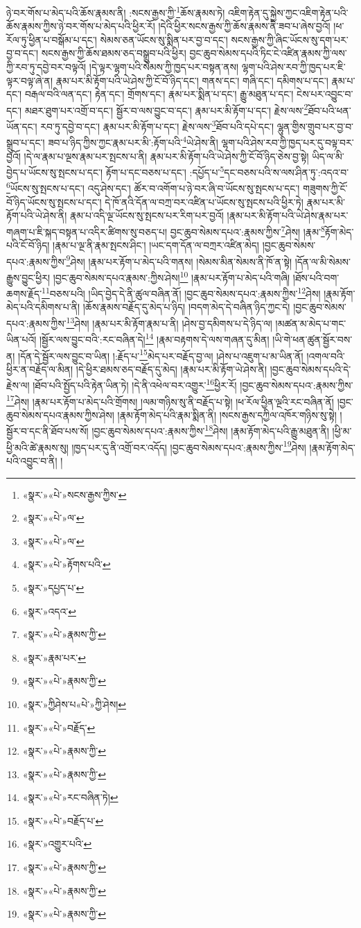 ཉེ་བར་གོས་པ་མེད་པའི་ཆོས་རྣམས་ནི། :སངས་རྒྱས་ཀྱི་\footnote{«སྣར་»«པེ་»སངས་རྒྱས་ཀྱིས་}ཆོས་རྣམས་ཏེ། འཇིག་རྟེན་དུ་སྐྱེས་ཀྱང་འཇིག་རྟེན་པའི་ཆོས་རྣམས་ཀྱིས་ཉེ་བར་གོས་པ་མེད་པའི་ཕྱིར་རོ། །དེའི་ཕྱིར་སངས་རྒྱས་ཀྱི་ཆོས་རྣམས་ནི་ཟབ་པ་ཞེས་བྱའོ། །ཕ་རོལ་ཏུ་ཕྱིན་པ་བསྒོམ་པ་དང་། སེམས་ཅན་ཡོངས་སུ་སྨིན་པར་བྱ་བ་དང་། སངས་རྒྱས་ཀྱི་ཞིང་ཡོངས་སུ་དག་པར་བྱ་བ་དང་། སངས་རྒྱས་ཀྱི་ཆོས་ཐམས་ཅད་བསྒྲུབ་པའི་ཕྱིར། བྱང་ཆུབ་སེམས་དཔའི་ཏིང་ངེ་འཛིན་རྣམས་ཀྱི་ལས་ཀྱི་རབ་ཏུ་དབྱེ་བར་བལྟའོ། །དེ་ལྟར་ལྷག་པའི་སེམས་ཀྱི་ཁྱད་པར་བསྟན་ནས། ལྷག་པའི་ཤེས་རབ་ཀྱི་ཁྱད་པར་ཇི་ལྟར་བལྟ་ཞེ་ན། རྣམ་པར་མི་རྟོག་པའི་ཡེ་ཤེས་ཀྱི་ངོ་བོ་ཉིད་དང་། གནས་དང་། གཞི་དང་། དམིགས་པ་དང་། རྣམ་པ་དང་། བརྒལ་བའི་ལན་དང་། རྟེན་དང་། གྲོགས་དང་། རྣམ་པར་སྨིན་པ་དང་། རྒྱུ་མཐུན་པ་དང་། ངེས་པར་འབྱུང་བ་དང་། མཐར་ཐུག་པར་འགྲོ་བ་དང་། སྦྱོར་བ་ལས་བྱུང་བ་དང་། རྣམ་པར་མི་རྟོག་པ་དང་། རྗེས་ལས་\footnote{«སྣར་»«པེ་»ལ་}ཐོབ་པའི་ཕན་ཡོན་དང་། རབ་ཏུ་དབྱེ་བ་དང་། རྣམ་པར་མི་རྟོག་པ་དང་། རྗེས་ལས་\footnote{«སྣར་»«པེ་»ལ་}ཐོབ་པའི་དཔེ་དང་། ལྷུན་གྱིས་གྲུབ་པར་བྱ་བ་སྒྲུབ་པ་དང་། ཟབ་པ་ཉིད་ཀྱིས་ཀྱང་རྣམ་པར་མི་:རྟོག་པའི་\footnote{«སྣར་»«པེ་»རྟོགས་པའི་}ཡེ་ཤེས་ནི། ལྷག་པའི་ཤེས་རབ་ཀྱི་ཁྱད་པར་དུ་བལྟ་བར་བྱའོ། །དེ་ལ་རྣམ་པ་ལྔས་རྣམ་པར་སྤངས་པ་ནི། རྣམ་པར་མི་རྟོག་པའི་ཡེ་ཤེས་ཀྱི་ངོ་བོ་ཉིད་ཅེས་བྱ་སྟེ། ཡིད་ལ་མི་བྱེད་པ་ཡོངས་སུ་སྤངས་པ་དང་། རྟོག་པ་དང་བཅས་པ་དང་། :དཔྱོད་པ་\footnote{«སྣར་»དཔྱད་པ་}དང་བཅས་པའི་ས་ལས་ཤིན་ཏུ་:འདའ་བ་\footnote{«སྣར་»འདའ་}ཡོངས་སུ་སྤངས་པ་དང་། འདུ་ཤེས་དང་། ཚོར་བ་འགོག་པ་ཉེ་བར་ཞི་བ་ཡོངས་སུ་སྤངས་པ་དང་། གཟུགས་ཀྱི་ངོ་བོ་ཉིད་ཡོངས་སུ་སྤངས་པ་དང་། དེ་ཁོ་ནའི་དོན་ལ་བཀྲ་བར་འཛིན་པ་ཡོངས་སུ་སྤངས་པའི་ཕྱིར་ཏེ། རྣམ་པར་མི་རྟོག་པའི་ཡེ་ཤེས་ནི། རྣམ་པ་འདི་ལྔ་ཡོངས་སུ་སྤངས་པར་རིག་པར་བྱའོ། །རྣམ་པར་མི་རྟོག་པའི་ཡེ་ཤེས་རྣམ་པར་གཞག་པ་ཇི་སྐད་བསྟན་པ་འདིར་ཚིགས་སུ་བཅད་པ། བྱང་ཆུབ་སེམས་དཔའ་:རྣམས་ཀྱིས་\footnote{«སྣར་»«པེ་»རྣམས་ཀྱི་}ཤེས། །རྣམ་\footnote{«སྣར་»རྣམ་པར་}རྟོག་མེད་པའི་ངོ་བོ་ཉིད། །རྣམ་པ་ལྔ་ནི་རྣམ་སྤངས་ཤིང་། །ཡང་དག་དོན་ལ་བཀྲར་འཛིན་མེད། །བྱང་ཆུབ་སེམས་དཔའ་:རྣམས་ཀྱིས་\footnote{«སྣར་»«པེ་»རྣམས་ཀྱི་}ཤེས། །རྣམ་པར་རྟོག་པ་མེད་པའི་གནས། །སེམས་མིན་སེམས་ནི་ཁོ་ན་སྟེ། །དོན་ལ་མི་སེམས་རྒྱུས་བྱུང་ཕྱིར། །བྱང་ཆུབ་སེམས་དཔའ་རྣམས་:ཀྱིས་ཤེས།\footnote{«སྣར་»ཀྱིཤེས་པ«པེ་»ཀྱི་ཤེས།} །རྣམ་པར་རྟོག་པ་མེད་པའི་གཞི། །ཐོས་པའི་བག་ཆགས་རྗོད་\footnote{«སྣར་»«པེ་»བརྗོད་}བཅས་པའི། །ཡིད་བྱེད་དེ་ནི་ཚུལ་བཞིན་ནོ། །བྱང་ཆུབ་སེམས་དཔའ་:རྣམས་ཀྱིས་\footnote{«སྣར་»«པེ་»རྣམས་ཀྱི་}ཤེས། །རྣམ་རྟོག་མེད་པའི་དམིགས་པ་ནི། །ཆོས་རྣམས་བརྗོད་དུ་མེད་པ་ཉིད། །བདག་མེད་དེ་བཞིན་ཉིད་ཀྱང་དེ། །བྱང་ཆུབ་སེམས་དཔའ་:རྣམས་ཀྱིས་\footnote{«སྣར་»«པེ་»རྣམས་ཀྱི་}ཤེས། །རྣམ་པར་མི་རྟོག་རྣམ་པ་ནི། །ཤེས་བྱ་དམིགས་པ་དེ་ཉིད་ལ། །མཚན་མ་མེད་པ་གང་ཡིན་པའོ། །སྦྱོར་ལས་བྱུང་བའི་:རང་བཞིན་དེ།\footnote{«སྣར་»«པེ་»རང་བཞིན་ཏེ།} །རྣམ་བརྟགས་དེ་ལས་གཞན་དུ་མིན། །ཡི་གེ་ཕན་ཚུན་སྦྱོར་བས་ན། །དོན་དེ་སྦྱོར་ལས་བྱུང་བ་ཡིན། །:རྗོད་པ་\footnote{«སྣར་»«པེ་»བརྗོད་པ་}མེད་པར་བརྗོད་བྱ་ལ། །ཤེས་པ་འཇུག་པ་མ་ཡིན་ནོ། །འགལ་བའི་ཕྱིར་ན་བརྗོད་ལ་མིན། །དེ་ཕྱིར་ཐམས་ཅད་བརྗོད་དུ་མེད། །རྣམ་པར་མི་རྟོག་ཡེ་ཤེས་ནི། །བྱང་ཆུབ་སེམས་དཔའི་དེ་རྗེས་ལ། །ཐོབ་པའི་སྤྱོད་པའི་རྟེན་ཡིན་ཏེ། །དེ་ནི་འཕེལ་བར་འགྱུར་\footnote{«སྣར་»འགྱུར་པའི་}ཕྱིར་རོ། །བྱང་ཆུབ་སེམས་དཔའ་:རྣམས་ཀྱིས་\footnote{«སྣར་»«པེ་»རྣམས་ཀྱི་}ཤེས། །རྣམ་པར་རྟོག་པ་མེད་པའི་གྲོགས། །ལམ་གཉིས་སུ་ནི་བརྗོད་པ་སྟེ། །ཕ་རོལ་ཕྱིན་ལྔའི་རང་བཞིན་ནོ། །བྱང་ཆུབ་སེམས་དཔའ་རྣམས་ཀྱིས་ཤེས། །རྣམ་རྟོག་མེད་པའི་རྣམ་སྨིན་ནི། །སངས་རྒྱས་དཀྱིལ་འཁོར་གཉིས་སུ་སྟེ། །སྦྱོར་བ་དང་ནི་ཐོབ་པས་སོ། །བྱང་ཆུབ་སེམས་དཔའ་:རྣམས་ཀྱིས་\footnote{«སྣར་»«པེ་»རྣམས་ཀྱི་}ཤེས། །རྣམ་རྟོག་མེད་པའི་རྒྱུ་མཐུན་ནི། །ཕྱི་མ་ཕྱི་མའི་ཚེ་རྣམས་སུ། །ཁྱད་པར་དུ་ནི་འགྲོ་བར་འདོད། །བྱང་ཆུབ་སེམས་དཔའ་:རྣམས་ཀྱིས་\footnote{«སྣར་»«པེ་»རྣམས་ཀྱི་}ཤེས། །རྣམ་རྟོག་མེད་པའི་འབྱུང་བ་ནི། །
